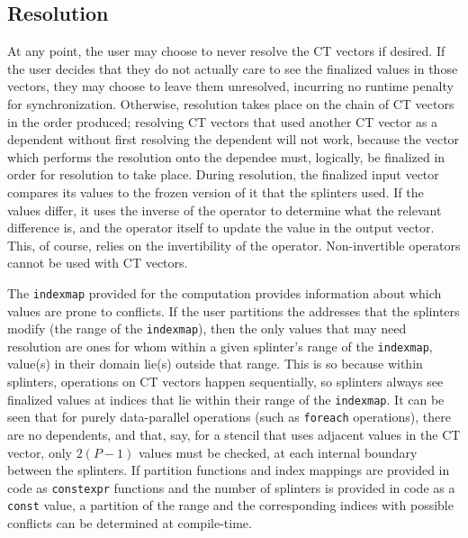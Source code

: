 \subsection{Resolution}
At any point, the user may choose to never resolve the CT vectors if desired. If
the user decides that they do not actually care to see the finalized values in
those vectors, they may choose to leave them unresolved, incurring no runtime
penalty for synchronization. Otherwise, resolution takes place on the chain of
CT vectors in the order produced; resolving CT vectors that used another CT
vector as a dependent without first resolving the dependent will not work,
because the vector which performs the resolution onto the dependee must,
logically, be finalized in order for resolution to take place. During
resolution, the finalized input vector compares its values to the frozen version
of it that the splinters used. If the values differ, it uses the inverse of the
operator to determine what the relevant difference is, and the operator itself
to update the value in the output vector. This, of course, relies on the
invertibility of the operator. Non-invertible operators cannot be used with CT
vectors.

The \texttt{indexmap} provided for the computation provides information about
which values are prone to conflicts. If the user partitions the addresses that
the splinters modify (the range of the \texttt{indexmap}), then the only values
that may need resolution are ones for whom within a given splinter's range of
the \texttt{indexmap}, value(s) in their domain lie(s) outside that range. This
is so because within splinters, operations on CT vectors happen sequentially, so
splinters always see finalized values at indices that lie within their range of
the \texttt{indexmap}. It can be seen that for purely data-parallel operations
(such as \texttt{foreach} operations), there are no dependents, and that, say,
for a stencil that uses adjacent values in the CT vector, only $2(P-1)$ values
must be checked, at each internal boundary between the splinters. If partition
functions and index mappings are provided in code as \texttt{constexpr}
functions and the number of splinters is provided in code as a \texttt{const}
value, a partition of the range and the corresponding indices with possible
conflicts can be determined at compile-time.
